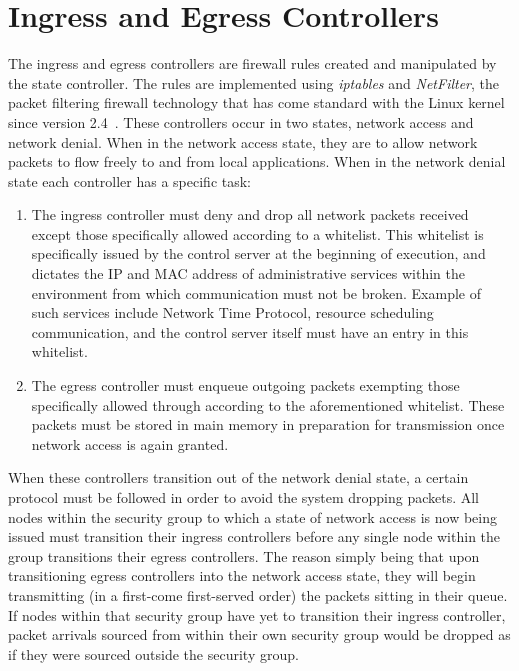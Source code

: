 \documentclass[oneside,12pt]{memoir}
\begin{document}
\section{Ingress and Egress Controllers}
The ingress and egress controllers are firewall rules created and manipulated by the state controller. The rules are implemented using \textit{iptables} and \textit{NetFilter}, the packet filtering firewall technology that has come standard with the Linux kernel since version 2.4~\cite{iptables}. These controllers occur in two states, network access and network denial. When in the network access state, they are to allow network packets to flow freely to and from local applications. When in the network denial state each controller has a specific task: 

\begin{enumerate}
\item The ingress controller must deny and drop all network packets received except those specifically allowed according to a whitelist. This whitelist is specifically issued by the control server at the beginning of execution, and dictates the IP and MAC address of administrative services within the environment from which communication must not be broken. Example of such services include Network Time Protocol, resource scheduling communication, and the control server itself must have an entry in this whitelist.
\item The egress controller must enqueue outgoing packets exempting those specifically allowed through according to the aforementioned whitelist. These packets must be stored in main memory in preparation for transmission once network access is again granted.
\end{enumerate}

When these controllers transition out of the network denial state, a certain protocol must be followed in order to avoid the system dropping packets. All nodes within the security group to which a state of network access is now being issued must transition their ingress controllers before any single node within the group transitions their egress controllers. The reason simply being that upon transitioning egress controllers into the network access state, they will begin transmitting (in a first-come first-served order) the packets sitting in their queue. If nodes within that security group have yet to transition their ingress controller, packet arrivals sourced from within their own security group would be dropped as if they were sourced outside the security group.
\end{document}
